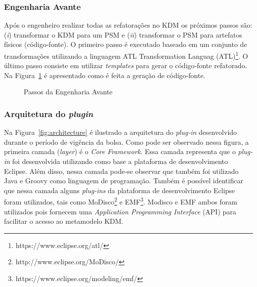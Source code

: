  \subsubsection{Engenharia Avante}

Após o engenheiro realizar todas as refatorações no KDM os próximos passos são: (\textit{i}) transformar o KDM para um PSM e (\textit{ii}) transformar o PSM para artefatos físicos (código-fonte). O primeiro passo é executado baseado em um conjunto de transformações utilizando a linguagem ATL Transformation Languag (ATL)\footnote{https://www.eclipse.org/atl/}. O último passo consiste em utilizar \textit{templates} para gerar o código-fonte refatorado.  Na Figura~\ref{fig:forward} é apresentado como é feita a geração de código-fonte.

\begin{figure}[!h]
 \centering
\caption{Passos da Engenharia Avante}
 \label{fig:forward}
\end{figure}

 \subsubsection{Arquitetura do \textit{plugin}}

Na Figura~\ref{fig:architecture} é ilustrado a arquitetura do \textit{plug-in} desenvolvido durante o período de vigência da bolsa. Como pode ser observado nessa figura, a primeira camada (\textit{layer}) é o \textit{Core Framework}. Essa camada representa que o \textit{plug-in} foi desenvolvida utilizando como base a plataforma de desenvolvimento Eclipse. Além disso, nessa camada pode-se observar que também foi utilizado Java e Groovy como linguagem de programação. Também é possível identificar que nessa camada alguns \textit{plug-ins} da plataforma de desenvolvimento Eclipse foram utilizados, tais como MoDisco\footnote{http://www.eclipse.org/MoDisco/} e EMF\footnote{https://www.eclipse.org/modeling/emf/}. Modisco e EMF ambos foram utilizados pois fornecem uma \textit{Application Programming Interface} (API) para facilitar o acesso ao metamodelo KDM.

